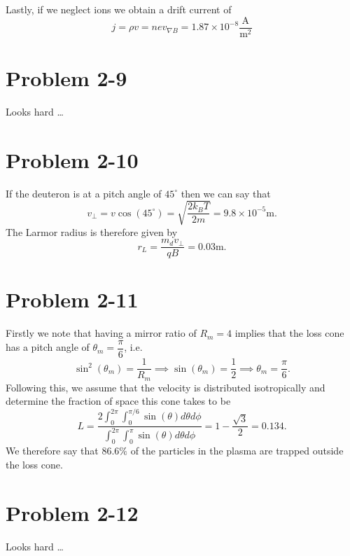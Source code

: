 Lastly, if we neglect ions we obtain a drift current of
\begin{equation}
	j = \rho v = nev_{\nabla B} = 1.87 \times 10^{-8} \dfrac{\text{A}}{\text{m}^2}
\end{equation}

\section*{Problem 2-9}
\label{sec:2-9}
Looks hard \dots

\section*{Problem 2-10}
\label{sec:2-10}
If the deuteron is at a pitch angle of \(45^\circ \) then we can say that
\begin{equation}
	v_\perp = v\cos(45^\circ) = \sqrt{\dfrac{2k_BT}{2m}} = 9.8 \times 10^{-5}\text{m}.
\end{equation}
The Larmor radius is therefore given by
\begin{equation}
	r_L = \dfrac{m_d v_\perp}{qB} = 0.03\text{m}.
\end{equation}

\section*{Problem 2-11}
\label{sec:2-11}
Firstly we note that having a mirror ratio of \(R_m = 4\) implies that the loss cone has a pitch angle of \(\theta_m = \dfrac{\pi}{6} \), i.e.
\begin{equation}
	\sin^2(\theta_m) = \dfrac{1}{R_m} \implies \sin(\theta_m) = \dfrac{1}{2} \implies \theta_m = \dfrac{\pi}{6}.
\end{equation}
Following this, we assume that the velocity is distributed isotropically and determine the fraction of space this cone takes to be
\begin{equation}
	L = \dfrac{2\int_0^{2\pi}\int_0^{\pi/6}\sin(\theta)d\theta d\phi}{\int_0^{2\pi}\int_0^{\pi}\sin(\theta)d\theta d\phi} = 1-\dfrac{\sqrt{3}}{2} = 0.134.
\end{equation}
We therefore say that \(86.6\% \) of the particles in the plasma are trapped outside the loss cone.

\section*{Problem 2-12}
\label{sec:2-12}
Looks hard \dots

